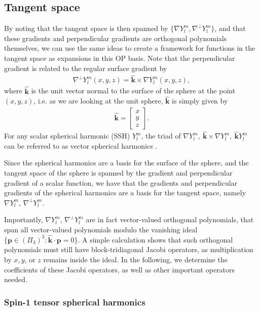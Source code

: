 \documentclass[11pt, oneside]{article}   	%
\newcommand{\Ylm}{Y^m_l}
\newcommand{\gradYlm}{\nabla Y^m_l}
\newcommand{\gradpYlm}{\nabla^\perp Y^m_l}
\newcommand{\unitvec}{\hat{\bm{k}}}
\begin{document}
\subsection{Tangent space}

By noting that the tangent space is then spanned by $\{\gradYlm, \gradpYlm\}$, and that these gradients and perpendicular gradients are orthogonal polynomials themselves, we can use the same ideas to create a framework for functions in the tangent space as expansions in this OP basis. Note that the perpendicular gradient is related to the regular surface gradient by
\begin{align}
\gradpYlm(x,y,z) = \unitvec \times \gradYlm(x,y,z),
\end{align}
where \(\unitvec\) is the unit vector normal to the surface of the sphere at the point \((x,y,z)\), i.e. as we are looking at the unit sphere, \(\unitvec\) is simply given by
\begin{align}
\unitvec = \begin{bmatrix} x \\ y \\ z \end{bmatrix}.
\end{align}
For any scalar spherical harmonic (SSH) $\Ylm$, the triad of $\gradYlm, \: \unitvec \times \gradYlm, \: \unitvec \Ylm$ can be referred to as vector spherical harmonics \cite{BarreraEtAl}.

Since the spherical harmonics are a basis for the surface of the sphere, and the tangent space of the sphere is spanned by the gradient  and perpendicular gradient of a scalar function, we have that the gradients and perpendicular gradients of the spherical harmonics are a basis for the tangent space, namely \(\gradYlm\), \(\gradpYlm\). 

Importantly,  \(\gradYlm\), \(\gradpYlm\) are in fact vector-valued orthogonal polynomials, that span all vector-valued polynomials modulo the vanishing ideal $\{ \bm{p} \in (\Pi_3)^3  : \unitvec \cdot \bm{p} = 0 \}$. A simple calculation shows that such orthogonal polynomials must still have block-tridiagonal Jacobi operators, as multiplication by $x, y$, or $z$ remains inside the ideal. In the following, we determine the coefficients of these Jacobi operators, as well as other important operators needed.

\subsubsection{Spin-1 tensor spherical harmonics}
\end{document}
